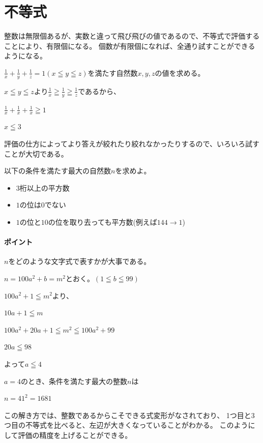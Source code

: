 \documentclass[uplatex,dvipdfmx]{jsbook}
\begin{document}
\section{不等式}
整数は無限個あるが、実数と違って飛び飛びの値であるので、不等式で評価することにより、有限個になる。
個数が有限個になれば、全通り試すことができるようになる。

\begin{problem}[例題]
    $\displaystyle\frac{1}{x}+\frac{1}{y}+\frac{1}{z}=1\left(x\leqq y\leqq z\right)$を満たす自然数$x,y,z$の値を求める。

    $x\leqq y\leqq z$より$\displaystyle\frac{1}{x}\geqq\frac{1}{y}\geqq\frac{1}{z}$であるから、

    $\displaystyle\frac{1}{x}+\frac{1}{x}+\frac{1}{x}\geqq 1$

    $x\leqq 3$
\end{problem}

評価の仕方によってより答えが絞れたり絞れなかったりするので、いろいろ試すことが大切である。

\begin{problem}[練習問題]
    以下の条件を満たす最大の自然数$n$を求めよ。
    \begin{itemize}
        \item $3$桁以上の平方数
        \item $1$の位は$0$でない
        \item $1$の位と$10$の位を取り去っても平方数(例えば$144\rightarrow 1$)
    \end{itemize}
\end{problem}

\paragraph{ポイント}$n$をどのような文字式で表すかが大事である。

\begin{answer}
    $n=100a^2+b=m^2$とおく。$\left(1\leqq b \leqq 99\right)$

    $100a^2+1 \leqq m^2$より、

    $10a+1 \leqq m$

    $100a^2+20a+1 \leqq m^2 \leqq 100a^2+99$

    $20a \leqq 98$

    よって$a\leqq 4$

    $a=4$のとき、条件を満たす最大の整数$n$は

    $n=41^2=1681$

    この解き方では、整数であるからこそできる式変形がなされており、
    1つ目と3つ目の不等式を比べると、左辺が大きくなっていることがわかる。
    このようにして評価の精度を上げることができる。
\end{answer}
\end{document}

